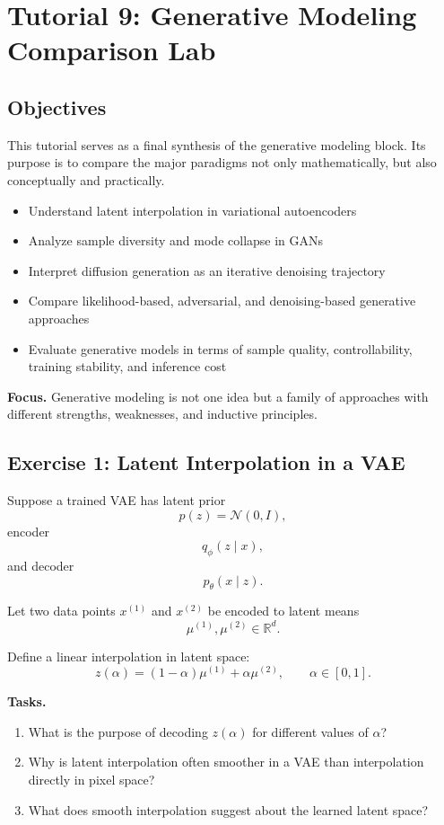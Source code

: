 \section{Tutorial 9: Generative Modeling Comparison Lab}

\subsection{Objectives}

This tutorial serves as a final synthesis of the generative modeling block. Its purpose is to compare the major paradigms not only mathematically, but also conceptually and practically.

\begin{itemize}
    \item Understand latent interpolation in variational autoencoders
    \item Analyze sample diversity and mode collapse in GANs
    \item Interpret diffusion generation as an iterative denoising trajectory
    \item Compare likelihood-based, adversarial, and denoising-based generative approaches
    \item Evaluate generative models in terms of sample quality, controllability, training stability, and inference cost
\end{itemize}

\medskip

\noindent
\textbf{Focus.}  
Generative modeling is not one idea but a family of approaches with different strengths, weaknesses, and inductive principles.

\subsection{Exercise 1: Latent Interpolation in a VAE}

Suppose a trained VAE has latent prior
\[
p(z)=\mathcal{N}(0,I),
\]
encoder
\[
q_\phi(z\mid x),
\]
and decoder
\[
p_\theta(x\mid z).
\]

Let two data points \(x^{(1)}\) and \(x^{(2)}\) be encoded to latent means
\[
\mu^{(1)}, \mu^{(2)} \in \mathbb{R}^d.
\]

Define a linear interpolation in latent space:
\[
z(\alpha) = (1-\alpha)\mu^{(1)} + \alpha \mu^{(2)}, \qquad \alpha\in[0,1].
\]

\medskip

\noindent
\textbf{Tasks.}
\begin{enumerate}
    \item What is the purpose of decoding \(z(\alpha)\) for different values of \(\alpha\)?
    \item Why is latent interpolation often smoother in a VAE than interpolation directly in pixel space?
    \item What does smooth interpolation suggest about the learned latent space?
\end{enumerate}

